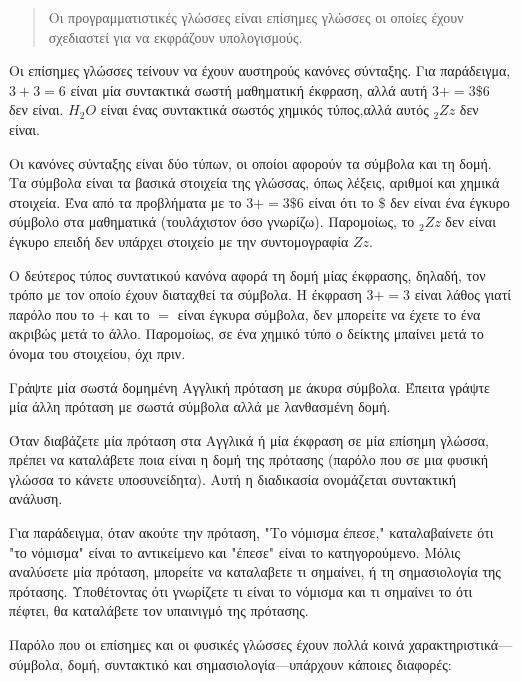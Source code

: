 \documentclass[10pt]{book}
\begin{document}
\begin{quote}
{Οι προγραμματιστικές γλώσσες είναι επίσημες γλώσσες οι οποίες έχουν σχεδιαστεί
για να εκφράζουν υπολογισμούς.}
\end{quote}

Οι επίσημες γλώσσες τείνουν να έχουν αυστηρούς κανόνες σύνταξης. Για
παράδειγμα,
$3 + 3 = 6$  είναι μία συντακτικά σωστή μαθηματική έκφραση, αλλά αυτή
$3 + = 3 \mbox{\$} 6$ δεν είναι.
$H_2O$ είναι ένας συντακτικά σωστός
χημικός τύπος,αλλά αυτός $_2Zz$ δεν είναι.

Οι κανόνες σύνταξης είναι δύο τύπων, οι οποίοι αφορούν τα σύμβολα
και τη δομή. Τα σύμβολα είναι τα βασικά στοιχεία της γλώσσας, όπως
λέξεις, αριθμοί και χημικά στοιχεία. Ένα από τα προβλήματα με το
$3 + = 3 \mbox{\$} 6$ είναι ότι το \( \$ \) δεν είναι ένα έγκυρο
σύμβολο στα μαθηματικά (τουλάχιστον όσο γνωρίζω). Παρομοίως, το
$_2Zz$ δεν είναι έγκυρο επειδή δεν υπάρχει στοιχείο με την συντομογραφία
$Zz$.


Ο δεύτερος τύπος συντατικού κανόνα αφορά τη δομή μίας έκφρασης,
δηλαδή, τον τρόπο με τον οποίο έχουν διαταχθεί τα σύμβολα.
Η έκφραση $3 + = 3$ είναι λάθος γιατί παρόλο που το $+$ και το
$=$ είναι έγκυρα σύμβολα, δεν μπορείτε να έχετε το ένα ακριβώς
μετά το άλλο. Παρομοίως, σε ένα χημικό τύπο ο δείκτης μπαίνει
μετά το όνομα του στοιχείου, όχι πριν.

\begin{exercise}

Γράψτε μία σωστά δομημένη Αγγλική πρόταση με άκυρα σύμβολα.
Έπειτα γράψτε μία άλλη πρόταση με σωστά σύμβολα αλλά με λανθασμένη
δομή.

\end{exercise}

Όταν διαβάζετε μία πρόταση στα Αγγλικά ή μία έκφραση σε μία επίσημη
γλώσσα, πρέπει να καταλάβετε ποια είναι η δομή της πρότασης
(παρόλο που σε μια φυσική γλώσσα το κάνετε υποσυνείδητα). Αυτή
η διαδικασία ονομάζεται συντακτική ανάλυση.

Για παράδειγμα, όταν ακούτε την πρόταση, "Το νόμισμα έπεσε,"
καταλαβαίνετε ότι "το νόμισμα" είναι το αντικείμενο και "έπεσε"
είναι το κατηγορούμενο. Μόλις αναλύσετε μία πρόταση, μπορείτε
να καταλαβετε τι σημαίνει, ή τη σημασιολογία της πρότασης.
Υποθέτοντας ότι γνωρίζετε τι είναι το νόμισμα και τι σημαίνει το ότι
πέφτει, θα καταλάβετε τον υπαινιγμό της πρότασης.

Παρόλο που οι επίσημες και οι φυσικές γλώσσες έχουν πολλά κοινά
χαρακτηριστικά---σύμβολα, δομή, συντακτικό και σημασιολογία---υπάρχουν
κάποιες διαφορές:
\end{document}
